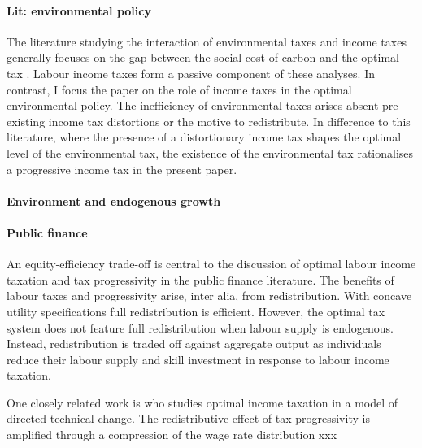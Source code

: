\paragraph{Lit: environmental policy}
The literature studying the interaction of environmental taxes and income taxes generally focuses on the gap between the social cost of carbon and the optimal tax \citep{Bovenberg1997EnvironmentalGrowth,  Kaplow2012OPTIMALTAXATION, Jacobs2019RedistributionCurves, Barrage2019OptimalPolicy}. Labour income taxes form a passive component of these analyses. 
In contrast, I focus the paper on the role of income taxes in the optimal environmental policy. The inefficiency of environmental taxes arises absent pre-existing income tax distortions or the motive to redistribute.
In difference to this literature, where the presence of a distortionary income tax shapes the optimal level of the environmental tax, the existence of the environmental tax rationalises a progressive income tax in the present paper.

\paragraph{Environment and endogenous growth}

\paragraph{Public finance}
An equity-efficiency trade-off is central to the discussion of optimal labour income taxation and tax progressivity in the public finance literature.  The benefits of labour taxes and progressivity arise, inter alia, from redistribution. %
With concave utility specifications full redistribution is efficient. However, the optimal tax system does not feature full redistribution when labour supply is endogenous. Instead, redistribution is traded off against aggregate output as individuals reduce their labour supply and skill investment in response to labour income taxation. 

One closely related work is \cite{Loebbing2019NationalChange} who studies optimal income taxation in a model of directed technical change. The redistributive effect of tax progressivity is amplified through a compression of the wage rate distribution xxx